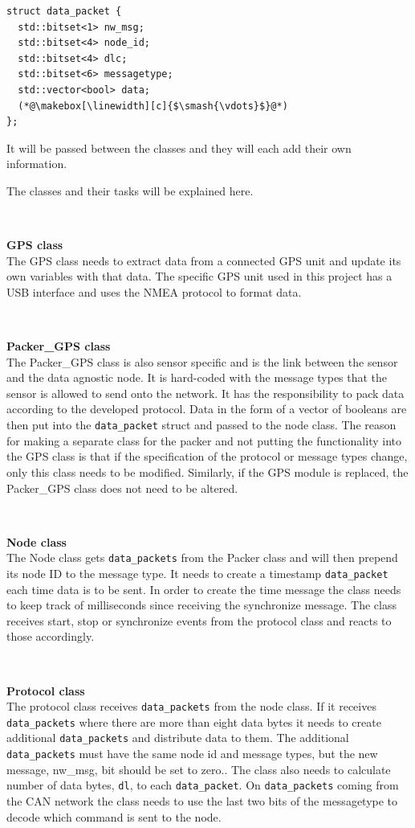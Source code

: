 \begin{lstlisting}[caption=Struct for data packet.,label=code:data_packet]
struct data_packet {
  std::bitset<1> nw_msg;
  std::bitset<4> node_id;
  std::bitset<4> dlc;
  std::bitset<6> messagetype;
  std::vector<bool> data; 
  (*@\makebox[\linewidth][c]{$\smash{\vdots}$}@*)
};
\end{lstlisting}
It will be passed between the classes and they will each add their own information. 

The classes and their tasks will be explained here.

~\\ \par \textbf{GPS class} ~ \\
The GPS class needs to extract data from a connected GPS unit and update its own variables with that data.
The specific GPS unit used in this project has a USB interface and uses the NMEA protocol to format data.

~\\ \par \textbf{Packer\_GPS class} ~ \\
The Packer\_GPS class is also sensor specific and is the link between the sensor and the data agnostic node.
It is hard-coded with the message types that the sensor is allowed to send onto the network.
It has the responsibility to pack data according to the developed protocol.
Data in the form of a vector of booleans are then put into the \texttt{data\_packet} struct and passed to the node class.
The reason for making a separate class for the packer and not putting the functionality into the GPS class is that if the specification of the protocol or message types change, only this class needs to be modified.
Similarly, if the GPS module is replaced, the Packer\_GPS class does not need to be altered.

~\\ \par \textbf{Node class} ~ \\
The Node class gets \texttt{data\_packets} from the Packer class and will then prepend its node ID to the message type.
It needs to create a timestamp \texttt{data\_packet} each time data is to be sent.
In order to create the time message the class needs to keep track of milliseconds since receiving the synchronize message.
The class receives start, stop or synchronize events from the protocol class and reacts to those accordingly.

~\\ \par \textbf{Protocol class} ~ \\
The protocol class receives \texttt{data\_packets} from the node class. 
If it receives \texttt{data\_packets} where there are more than eight data bytes it needs to create additional \texttt{data\_packets} and distribute data to them. 
The additional \texttt{data\_packets} must have the same node id and message types, but the new message, nw\_msg, bit should be set to zero..
The class also needs to calculate number of data bytes, \texttt{dl}, to each \texttt{data\_packet}.
On \texttt{data\_packets} coming from the CAN network the class needs to use the last two bits of the messagetype to decode which command is sent to the node.

